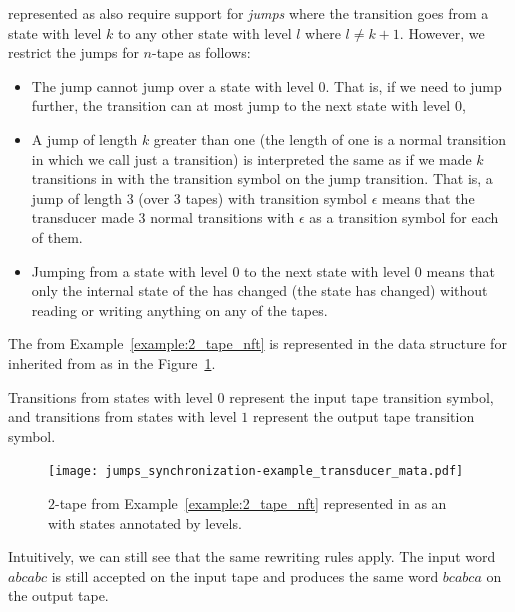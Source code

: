 \nfts represented as \nfaClass also require support for \emph{jumps} where the transition goes from a state with level $k$ to any other state with level $l$ where $l \neq k + 1$.
However, we restrict the jumps for $n$-tape \nft as follows:
\begin{itemize}
  \item The jump cannot jump over a state with level $0$.
  That is, if we need to jump further, the transition can at most jump to the next state with level $0$,
  \item A jump of length $k$ greater than one (the length of one is a normal transition in \nfaClass which we call just a transition) is interpreted the same as if we made $k$ transitions in \nfaClass with the transition symbol on the jump transition.
  That is, a jump of length $3$ (over $3$ tapes) with transition symbol $\epsilon$ means that the transducer made $3$ normal transitions with $\epsilon$ as a transition symbol for each of them.
  \item Jumping from a state with level $0$ to the next state with level $0$ means that only the internal state of the \nft has changed (the state has changed) without reading or writing anything on any of the tapes.
\end{itemize}





\begin{example}\label{example:2_tape_nft_in_mata}
  The \nft from Example~\ref{example:2_tape_nft} is represented in the data structure for \nfts inherited from \nfaClass as in the Figure~\ref{fig:2_tape_nft_in_mata}.

  Transitions from states with level $0$ represent the input tape transition symbol, and transitions from states with level $1$ represent the output tape transition symbol.

  \begin{figure}[ht]
    \centering
    \texttt{[image: jumps\_synchronization-example\_transducer\_mata.pdf]}
    \caption{
      $2$-tape \nft from Example~\ref{example:2_tape_nft} represented in \mata as an \nfaClass with states annotated by levels.
    }\label{fig:2_tape_nft_in_mata}
  \end{figure}

Intuitively, we can still see that the same rewriting rules apply.
The input word $abcabc$ is still accepted on the input tape and produces the same word $bcabca$ on the output tape.

\end{example}

